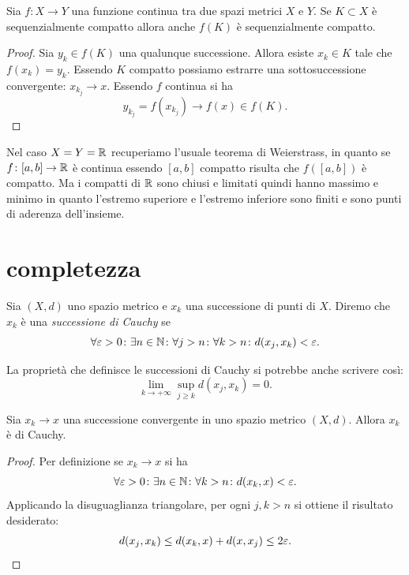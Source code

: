 \begin{theorem}
Sia $f\colon X \to Y$ una funzione continua tra
due spazi metrici $X$ e $Y$.
Se $K\subset X$ è sequenzialmente compatto allora
anche $f(K)$ è sequenzialmente compatto.
\end{theorem}
%
\begin{proof}
Sia $y_k \in f(K)$ una qualunque successione. Allora
esiste $x_k \in K$ tale che $f(x_k) = y_k$.
Essendo $K$ compatto possiamo estrarre una sottosuccessione convergente: $x_{k_j}\to x$. Essendo $f$ continua si ha
\[
  y_{k_j} = f(x_{k_j}) \to f(x) \in f(K).
\]
\end{proof}

Nel caso $X=Y=\mathbb R$ recuperiamo l'usuale teorema di Weierstrass, in quanto se $f\colon [a,b]\to \mathbb R$ è continua essendo $[a,b]$ compatto risulta che $f([a,b])$ è compatto. Ma i compatti di $\mathbb R$ sono chiusi e limitati quindi hanno massimo e minimo in quanto l'estremo superiore e l'estremo inferiore sono finiti e sono punti di aderenza dell'insieme.

\section{completezza}

\begin{definition}
\mymark{***}
Sia $(X,d)$ uno spazio metrico e $x_k$ una successione di punti di $X$.
Diremo che $x_k$ è una
\emph{successione di Cauchy}
se
\[
 \forall \varepsilon>0\colon \exists n\in \mathbb N\colon \forall j>n \colon \forall k > n \colon d(x_j,x_k) < \varepsilon.
\]
\end{definition}

La proprietà che definisce le successioni di Cauchy
si potrebbe anche scrivere così:
\[
  \lim_{k \to +\infty} \sup_{j\ge k} d(x_j, x_k) = 0.
\]

\begin{theorem}
\mymark{**}%
\label{th:se_converge_cauchy}
Sia $x_k\to x$ una successione convergente in uno spazio metrico $(X,d)$. Allora $x_k$ è di Cauchy.
\end{theorem}
%
\begin{proof}
\mymark{**}
Per definizione se $x_k \to x$ si ha
\[
  \forall \varepsilon>0\colon \exists n\in \mathbb N \colon
  \forall k>n \colon d(x_k,x)< \varepsilon.
\]
Applicando la disuguaglianza triangolare, per ogni $j,k>n$
si ottiene il risultato desiderato:
\[
  d(x_j, x_k) \le d(x_k,x) + d(x,x_j) \le 2\varepsilon.
\]
\end{proof}

